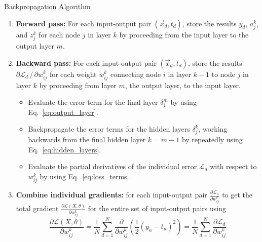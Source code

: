 \documentclass[../main.tex]{subfiles}
\begin{document}
%
\begin{algorithm}[htpb]
    \AlgoDontDisplayBlockMarkers\SetAlgoNoEnd\SetAlgoNoLine%
    \DontPrintSemicolon%
    \caption{Backpropagation Algorithm}%
    \;
    \begin{enumerate}
      \item \textbf{Forward pass:} For each input-output pair $(\vec{x}_{d}, t_{d})$, store the results $y_{d}$,
        $a_{j}^{k}$, and $z_{j}^{k}$ for each node $j$ in layer $k$ by proceeding from the input layer to the output
        layer $m$.\;
      \item \textbf{Backward pass:} For each input-output pair $(\vec{x}_{d}, t_{d})$, store the results $\partial
        \mathcal{L}_{d}\,/\, \partial w_{ij}^{k}$ for each weight $w_{ij}^{k}$ connecting node $i$ in layer $k - 1$ to
        node $j$ in layer $k$ by proceeding from layer $m$, the output layer, to the input layer.\;
        \begin{itemize}
          \item Evaluate the error term for the final layer $\delta_{1}^{m}$ by using Eq.~\ref{eq:output_layer}.\;
          \item Backpropagate the error terms for the hidden layers $\delta_{j}^{k}$, working backwards from the final
            hidden layer $k = m - 1$ by repeatedly using Eq.~\ref{eq:hidden_layers}.\;
          \item Evaluate the partial derivatives of the individual error $\mathcal{L}_{d}$ with respect to $w_{ij}^{k}$
            by using Eq.~\ref{eq:loss_terms}.\;
        \end{itemize}
      \item \textbf{Combine individual gradients:} for each input-output pair $\frac{\partial \mathcal{L}_{n}}{\partial
        w_{ij}^{k}}$ to get the total gradient $\frac{\partial \mathcal{L}(X, \theta)}{\partial w_{ij}^{k}}$ for the
          entire set of input-output pairs using\;
          \begin{equation*}
            \frac{\partial \mathcal{L}(X, \theta)}{\partial w_{ij}^{k}} =
              \frac{1}{N}\sum_{d=1}^{N}\frac{\partial}{\partial w_{ij}^{k}} {\left(\frac{1}{2}{(y_n -
                t_{n})}^{2}\right)} = \frac{1}{N}\sum_{d=1}^{N}\frac{\partial \mathcal{L}_{d}}{\partial w_{ij}^{k}}
          \end{equation*}
    \end{enumerate}%
\label{alg:backprop_algorithm}
\end{algorithm}
\end{document}
